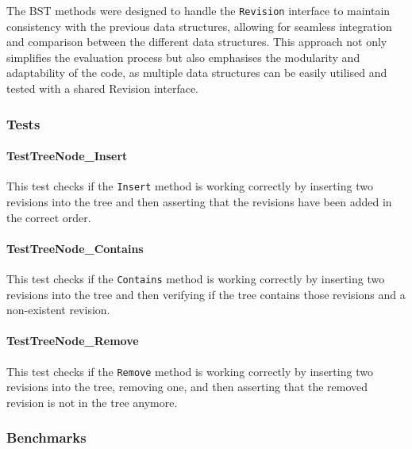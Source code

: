 The BST methods were designed to handle the \lstinline{Revision} interface to maintain consistency with the previous data structures, allowing for seamless integration and comparison between the different data structures. This approach not only simplifies the evaluation process but also emphasises the modularity and adaptability of the code, as multiple data structures can be easily utilised and tested with a shared Revision interface.

\subsubsection{Tests}
\paragraph{TestTreeNode\_Insert}
This test checks if the \lstinline{Insert} method is working correctly by inserting two revisions into the tree and then asserting that the revisions have been added in the correct order.

\paragraph{TestTreeNode\_Contains}
This test checks if the \lstinline{Contains} method is working correctly by inserting two revisions into the tree and then verifying if the tree contains those revisions and a non-existent revision.

\paragraph{TestTreeNode\_Remove}
This test checks if the \lstinline{Remove} method is working correctly by inserting two revisions into the tree, removing one, and then asserting that the removed revision is not in the tree anymore.

\subsubsection{Benchmarks}

